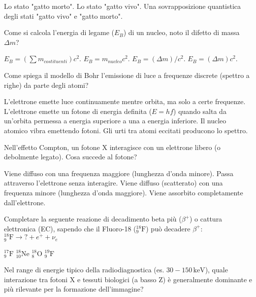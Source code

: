 \documentclass{exam}%
\begin{document}
\begin{questions}
\begin{choices}
\choice Lo stato "gatto morto".%
\choice Lo stato "gatto vivo".%
\choice Una sovrapposizione quantistica degli stati "gatto vivo" e "gatto morto".%
\end{choices}%
\question Come si calcola l'energia di legame ($E_B$) di un nucleo, noto il difetto di massa $\Delta m$?%
\vspace{0.2em}%
\begin{multicols}{4}%
\begin{choices}%
\choice $E_B = (\sum m_{costituenti}) c^2$.%
\choice $E_B = m_{nucleo} c^2$.%
\choice $E_B = (\Delta m) / c^2$.%
\choice $E_B = (\Delta m) c^2$.%
\end{choices}%
\end{multicols}%
\question Come spiega il modello di Bohr l'emissione di luce a frequenze discrete (spettro a righe) da parte degli atomi?%
\vspace{0.2em}%
\begin{choices}%
\choice L'elettrone emette luce continuamente mentre orbita, ma solo a certe frequenze.%
\choice L'elettrone emette un fotone di energia definita ($E = hf$) quando salta da un'orbita permessa a energia superiore a una a energia inferiore.%
\choice Il nucleo atomico vibra emettendo fotoni.%
\choice Gli urti tra atomi eccitati producono lo spettro.%
\end{choices}%
\question Nell'effetto Compton, un fotone X interagisce con un elettrone libero (o debolmente legato). Cosa succede al fotone?%
\vspace{0.2em}%
\begin{choices}%
\choice Viene diffuso con una frequenza maggiore (lunghezza d'onda minore).%
\choice Passa attraverso l'elettrone senza interagire.%
\choice Viene diffuso (scatterato) con una frequenza minore (lunghezza d'onda maggiore).%
\choice Viene assorbito completamente dall'elettrone.%
\end{choices}%
\question Completare la seguente reazione di decadimento beta più ($\beta^+$) o cattura elettronica (EC), sapendo che il Fluoro-18 ($^{18}_{9}\text{F}$) può decadere $\beta^+$: $^{18}_{9}\text{F} \rightarrow ? + e^+ + \nu_e$%
\vspace{0.2em}%
\begin{multicols}{4}%
\begin{choices}%
\choice $^{17}_{9}\text{F}$%
\choice $^{18}_{10}\text{Ne}$%
\choice $^{18}_{8}\text{O}$%
\choice $^{19}_{9}\text{F}$%
\end{choices}%
\end{multicols}%
\question Nel range di energie tipico della radiodiagnostica (es. $30-150 \, \text{keV}$), quale interazione tra fotoni X e tessuti biologici (a basso Z) è generalmente dominante e più rilevante per la formazione dell'immagine?%

\end{questions}
\end{document}

